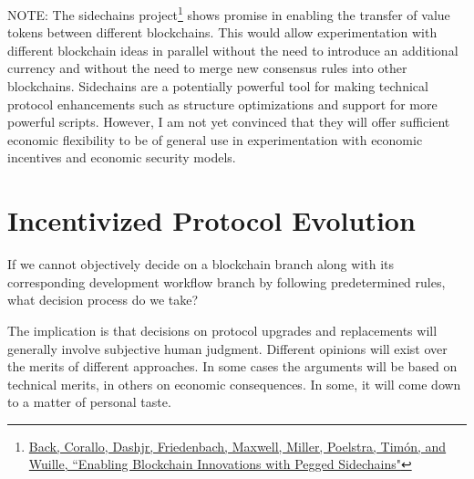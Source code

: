 \documentclass{article}
\begin{document}
\pagebreak

NOTE: The sidechains project\footnote{\href{http://www.blockstream.com/sidechains.pdf}{Back, Corallo, Dashjr, Friedenbach, Maxwell, Miller, Poelstra, Tim\'{o}n, and Wuille, ``Enabling Blockchain Innovations with Pegged Sidechains"}} shows promise in enabling the transfer of value tokens between different blockchains. This would allow experimentation with different blockchain ideas in parallel without the need to introduce an additional currency and without the need to merge new consensus rules into other blockchains. Sidechains are a potentially powerful tool for making technical protocol enhancements such as structure optimizations and support for more powerful scripts. However, I am not yet convinced that they will offer sufficient economic flexibility to be of general use in experimentation with economic incentives and economic security models.

\pagebreak

\section{Incentivized Protocol Evolution}

If we cannot objectively decide on a blockchain branch along with its corresponding development workflow branch by following predetermined rules, what decision process do we take?

The implication is that decisions on protocol upgrades and replacements will generally involve subjective human judgment. Different opinions will exist over the merits of different approaches. In some cases the arguments will be based on technical merits, in others on economic consequences. In some, it will come down to a matter of personal taste.
\end{document}
